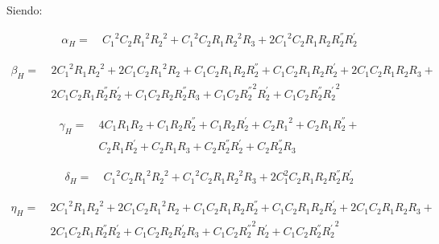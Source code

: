 \documentclass[a4paper]{article}
\begin{document}
Siendo: 

\begin{equation*}
\begin{split}
	\alpha_H =\ & {C_{1}}^{2} C_{2} {R_{1}}^{2} {R_{2}}^{2} + {C_{1}}^{2} C_{2} R_{1} {R_{2}}^{2} R_{3} + 2 {C_{1}}^{2} C_{2} R_{1} R_{2} R_{2}^{''} R_{2}^{'}
\end{split}
\end{equation*}

\begin{equation*}
\begin{split}
	\beta_H =\ & 2 {C_{1}}^{2} R_{1} {R_{2}}^{2} + 2 C_{1} C_{2} {R_{1}}^{2} R_{2} + C_{1} C_{2} R_{1} R_{2} R_{2}^{''} + C_{1} C_{2} R_{1} R_{2} R_{2}^{'} + 2 C_{1} C_{2} R_{1} R_{2} R_{3} +\\
	&2 C_{1} C_{2} R_{1} R_{2}^{''} R_{2}^{'} + C_{1} C_{2} R_{2} R_{2}^{''} R_{3} + C_{1} C_{2} {R_{2}^{''}}^{2} R_{2}^{'} + C_{1} C_{2} R_{2}^{''} {R_{2}^{'}}^{2}
\end{split}
\end{equation*}

\begin{equation*}
\begin{split}
	\gamma_H =\ & 4 C_{1} R_{1} R_{2} + C_{1} R_{2} R_{2}^{''} + C_{1} R_{2} R_{2}^{'} + C_{2} {R_{1}}^{2} + C_{2} R_{1} R_{2}^{''} +\\ & C_{2} R_{1} R_{2}^{'} + C_{2} R_{1} R_{3} + C_{2} R_{2}^{''} R_{2}^{'} + C_{2} R_{2}^{''} R_{3}
\end{split}
\end{equation*}

\begin{equation*}
\begin{split}
 \delta_H =\ & {C_{1}}^{2} C_{2} {R_{1}}^{2} {R_{2}}^{2} + {C_{1}}^{2} C_{2} R_{1} {R_{2}}^{2} R_{3} + 2 C_{1}^{2} C_{2} R_{1} R_{2} R_{2}^{''} R_{2}^{'}
\end{split}
\end{equation*}

\begin{equation*}
\begin{split}
	\eta_H =\ & 2 {C_{1}}^{2} R_{1} {R_{2}}^{2} + 2 C_{1} C_{2} {R_{1}}^{2} R_{2} + C_{1} C_{2} R_{1} R_{2} R_{2}^{''} + C_{1} C_{2} R_{1} R_{2} R_{2}^{'} + 2 C_{1} C_{2} R_{1} R_{2} R_{3} +\\ &
	2 C_{1} C_{2} R_{1} R_{2}^{''} R_{2}^{'} + C_{1} C_{2} R_{2} R_{2}^{'} R_{3} + C_{1} C_{2} {R_{2}^{''}}^{2} R_{2}^{'} + C_{1} C_{2} R_{2}^{''} {R_{2}^{'}}^{2}
\end{split}
\end{equation*}
\end{document}
